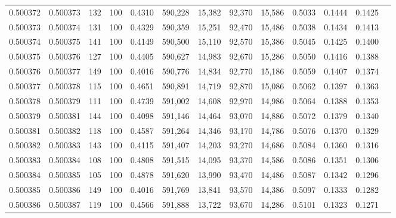 \begin{tabular}{rrrrrrrrrrrrr}
0.500372 & 0.500373 &   132 & 100 &                                     0.4310 & 590,228 &  15,382 &  92,370 &  15,586 & 0.5033 & 0.1444 & 0.1425 \\
0.500373 & 0.500374 &   131 & 100 &                                     0.4329 & 590,359 &  15,251 &  92,470 &  15,486 & 0.5038 & 0.1434 & 0.1413 \\
0.500374 & 0.500375 &   141 & 100 &                                     0.4149 & 590,500 &  15,110 &  92,570 &  15,386 & 0.5045 & 0.1425 & 0.1400 \\
0.500375 & 0.500376 &   127 & 100 &                                     0.4405 & 590,627 &  14,983 &  92,670 &  15,286 & 0.5050 & 0.1416 & 0.1388 \\
0.500376 & 0.500377 &   149 & 100 &                                     0.4016 & 590,776 &  14,834 &  92,770 &  15,186 & 0.5059 & 0.1407 & 0.1374 \\
0.500377 & 0.500378 &   115 & 100 &                                     0.4651 & 590,891 &  14,719 &  92,870 &  15,086 & 0.5062 & 0.1397 & 0.1363 \\
0.500378 & 0.500379 &   111 & 100 &                                     0.4739 & 591,002 &  14,608 &  92,970 &  14,986 & 0.5064 & 0.1388 & 0.1353 \\
0.500379 & 0.500381 &   144 & 100 &                                     0.4098 & 591,146 &  14,464 &  93,070 &  14,886 & 0.5072 & 0.1379 & 0.1340 \\
0.500381 & 0.500382 &   118 & 100 &                                     0.4587 & 591,264 &  14,346 &  93,170 &  14,786 & 0.5076 & 0.1370 & 0.1329 \\
0.500382 & 0.500383 &   143 & 100 &                                     0.4115 & 591,407 &  14,203 &  93,270 &  14,686 & 0.5084 & 0.1360 & 0.1316 \\
0.500383 & 0.500384 &   108 & 100 &                                     0.4808 & 591,515 &  14,095 &  93,370 &  14,586 & 0.5086 & 0.1351 & 0.1306 \\
0.500384 & 0.500385 &   105 & 100 &                                     0.4878 & 591,620 &  13,990 &  93,470 &  14,486 & 0.5087 & 0.1342 & 0.1296 \\
0.500385 & 0.500386 &   149 & 100 &                                     0.4016 & 591,769 &  13,841 &  93,570 &  14,386 & 0.5097 & 0.1333 & 0.1282 \\
0.500386 & 0.500387 &   119 & 100 &                                     0.4566 & 591,888 &  13,722 &  93,670 &  14,286 & 0.5101 & 0.1323 & 0.1271 \\

\end{tabular}
